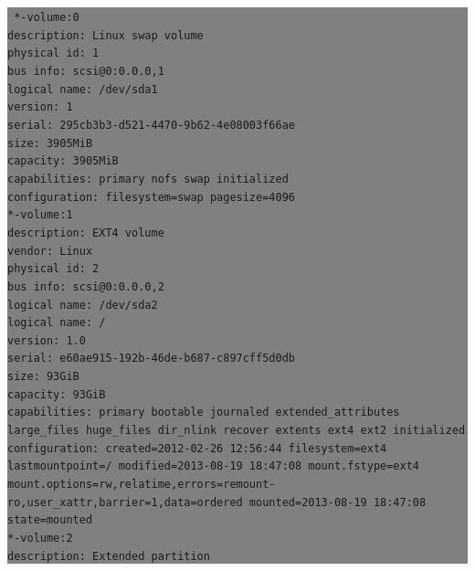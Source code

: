 \documentclass[12pt]{article}
\begin{document}
\colorbox{grey}{\parbox[t]{0.95\linewidth}{ \vspace*{0.5cm} { 
{\tt \scriptsize
              *-volume:0\\
                   description: Linux swap volume\\
                   physical id: 1\\
                   bus info: scsi@0:0.0.0,1\\
                   logical name: /dev/sda1\\
                   version: 1\\
                   serial: 295cb3b3-d521-4470-9b62-4e08003f66ae\\
                   size: 3905MiB\\
                   capacity: 3905MiB\\
                   capabilities: primary nofs swap initialized\\
                   configuration: filesystem=swap pagesize=4096\\
              *-volume:1\\
                   description: EXT4 volume\\
                   vendor: Linux\\
                   physical id: 2\\
                   bus info: scsi@0:0.0.0,2\\
                   logical name: /dev/sda2\\
                   logical name: /\\
                   version: 1.0\\
                   serial: e60ae915-192b-46de-b687-c897cff5d0db\\
                   size: 93GiB\\
                   capacity: 93GiB\\
                   capabilities: primary bootable journaled extended\_attributes large\_files huge\_files dir\_nlink recover extents ext4 ext2 initialized\\
                   configuration: created=2012-02-26 12:56:44 filesystem=ext4 lastmountpoint=/ modified=2013-08-19 18:47:08 mount.fstype=ext4 mount.options=rw,relatime,errors=remount-ro,user\_xattr,barrier=1,data=ordered mounted=2013-08-19 18:47:08 state=mounted\\
              *-volume:2\\
                   description: Extended partition\\
}}}}
\end{document}
